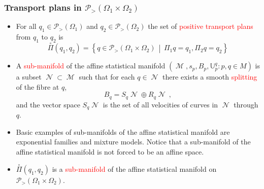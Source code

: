 \documentclass[xcolor=svgnames]{beamer}
\DeclareMathOperator{\M}{\mathcal M}
\DeclareMathOperator{\N}{\mathcal N}
\newcommand{\eBspace}[1]{B_{#1}}
\newcommand{\openplan}[2]{\overset{\circ}\Pi\left(#1,#2\right)}
\newcommand{\opensimplexon}[1]{\mathcal P_>\left(#1\right)}
\newcommand{\rosso}[1]{\textcolor{red}{#1}}
\newcommand{\setof}[2]{\left\{#1 \, \middle| \, #2 \right\}}
\newcommand{\transport}[2]{{\mathbb U} _ {#1} ^ {#2}}
\renewcommand{\emph}{\rosso}
\begin{document}
\begin{frame}[plain]\small\frametitle{Transport plans in $\opensimplexon{\Omega_1 \times \Omega_2}$}
 \begin{itemize}
 
     \item For all $q_1 \in \opensimplexon{\Omega_1}$ and $q_2 \in \opensimplexon{\Omega_2}$ the set of \emph{positive transport plans} from $q_1$ to $q_2$ is
     \begin{equation*}
         \openplan{q_1}{q_2} = \setof{q \in \opensimplexon{\Omega_1 \times \Omega_2}}{\Pi_1 q = q_1,\Pi_2 q= q_2}
     \end{equation*}
 
   \item A \emph{sub-manifold} of the affine statistical manifold $(\M,s_p,\eBspace p,\transport p q \colon p,q \in M)$ is a subset $\N \subset \M$ such that for each $q \in \N$ there exists a smooth \emph{splitting} of the fibre at $q$,
     \begin{equation*}
       \eBspace q = S_q \N \oplus R_q \N \ ,
     \end{equation*}
     and the vector space $S_q \N$ is the set of all velocities of curves in $\N$ through $q$. 

\item Basic examples of sub-manifolds of the affine statistical manifold are exponential families and mixture models. Notice that a sub-manifold of the affine statistical manifold is not forced to be an affine space.

\item $\openplan{q_1}{q_2}$ is a \emph{sub-manifold} of the affine statistical manifold on $\opensimplexon{\Omega_1 \times \Omega_2}$.

\end{itemize}
\end{frame}
\end{document}
